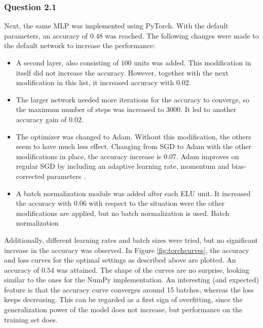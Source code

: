 \documentclass{article}
\begin{document}
\subsubsection*{Question 2.1}
Next, the same MLP was implemented using PyTorch. With the default parameters, an accuracy of 0.48 was reached. The following changes were made to the default network to increase the performance:
\begin{itemize}
	\item A second layer, also consisting of $100$ units was added. This modification in itself did not increase the accuracy. However, together with the next modification in this list, it increased accuracy with $0.02$.
	\item The larger network needed more iterations for the accuracy to converge, so the maximum number of steps was increased to $3000$. It led to another accuracy gain of $0.02$.
	\item The optimizer was changed to Adam. Without this modification, the others seem to have much less effect. Changing from SGD to Adam with the other modifications in place, the accuracy increase is $0.07$. Adam improves on regular SGD by including an adaptive learning rate, momentum and bias-corrected parameters \cite{kingma2019method}.
	\item A batch normalization module was added after each ELU unit. It increased the accuracy with $0.06$ with respect to the situation were the other modifications are applied, but no batch normalization is used. Batch normalization 
\end{itemize}
Additionally, different learning rates and batch sizes were tried, but no significant increase in the accuracy was observed. In Figure \ref{fig:torchcurves}, the accuracy and loss curves for the optimal settings as described above are plotted. An accuracy of $0.54$ was attained. The shape of the curves are no surprise, looking similar to the ones for the NumPy implementation. An interesting (and expected) feature is that the accuracy curve converges around 15 batches, whereas the loss keeps decreasing. This can be regarded as a first sign of overfitting, since the generalization power of the model does not increase, but performance on the training set does. 
\end{document}
